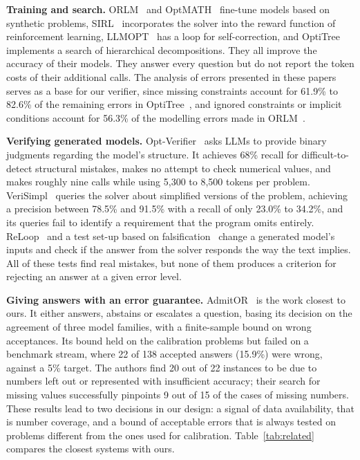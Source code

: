 \documentclass[conference]{IEEEtran}
\begin{document}
\textbf{Training and search.} ORLM~\cite{huang2025orlm} and OptMATH~\cite{lu2025optmath} fine-tune models based on
synthetic problems, SIRL~\cite{chen2025sirl} incorporates the solver into the reward function of reinforcement
learning, LLMOPT~\cite{jiang2025llmopt} has a loop for self-correction, and OptiTree~\cite{liu2025optitree}
implements a search of hierarchical decompositions. They all improve the accuracy of their models. They answer every
question but do not report the token costs of their additional calls. The analysis of errors presented in
these papers serves as a base for our verifier, since missing constraints account for 61.9\% to 82.6\% of the
remaining errors in OptiTree~\cite{liu2025optitree}, and ignored constraints or implicit conditions account for
56.3\% of the modelling errors made in ORLM~\cite{huang2025orlm}.

\textbf{Verifying generated models.} Opt-Verifier~\cite{liu2026optverifier} asks LLMs to provide binary judgments
regarding the model's structure. It achieves 68\% recall for difficult-to-detect structural mistakes, makes no attempt
to check numerical values, and makes roughly nine calls while using 5,300 to 8,500 tokens per problem.
VeriSimpl~\cite{abdulrahman2026verisimpl} queries the solver about simplified versions of the problem, achieving a
precision between 78.5\% and 91.5\% with a recall of only 23.0\% to 34.2\%, and its queries fail to identify a
requirement that the program omits entirely. ReLoop~\cite{lian2026reloop} and a test set-up based on
falsification~\cite{li2026falsification} change a generated model's inputs and check if the answer from the solver
responds the way the text implies. All of these tests find real mistakes, but none of them produces a criterion for
rejecting an answer at a given error level.

\textbf{Giving answers with an error guarantee.} AdmitOR~\cite{lian2026admitor} is the work closest to ours. It either
answers, abstains or escalates a question, basing its decision on the agreement of three model families, with a
finite-sample bound on wrong acceptances. Its bound held on the calibration problems but failed on a benchmark stream,
where 22 of 138 accepted answers (15.9\%) were wrong, against a 5\% target. The authors find 20 out of 22 instances to be due to numbers left out or represented
with insufficient accuracy; their search for missing values successfully pinpoints 9 out of 15 of the cases of missing
numbers. These results lead to two decisions in our design: a signal of data availability, that is number coverage,
and a bound of acceptable errors that is always tested on problems different from the ones used for calibration. Table~\ref{tab:related} compares
the closest systems with ours.
\end{document}
